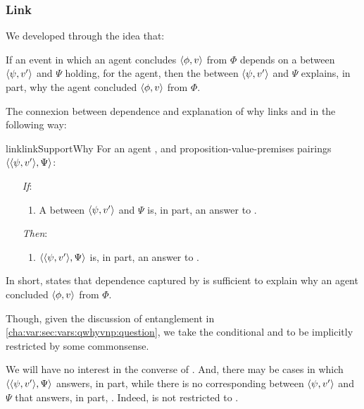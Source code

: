 \subsubsection{Link}
\label{cha:var:sec:vars:qwhyvnp:link}

\begin{note}
  We developed \qWhyV{} through the idea that:

  If an event in which an agent concludes \(\langle \phi, v \rangle\) from \(\Phi\) depends on a  between \(\langle \psi, v' \rangle\) and \(\Psi\) holding, for the agent, then the  between \(\langle \psi, v' \rangle\) and \(\Psi\) explains, in part, why the agent concluded \(\langle \phi, v \rangle\) from \(\Phi\).

  The connexion between dependence and explanation of why links \qWhyV{} and \qWhy{} in the following way:

  \begin{restatable}{link}{linkSupportWhy}
    \label{link:why:support:pvpp}
    For an agent \vAgent{}, and proposition-value-premises pairings \(\langle \langle \psi, v' \rangle, \Psi \rangle\):

    \begin{itemize}
    \item[\emph{If}:]
      \begin{enumerate}[label=\alph*., ref=(\alph*)]
      \item
        A  between \(\langle \psi, v' \rangle\) and \(\Psi\) is, in part, an answer to \qWhyV{}.
      \end{enumerate}
    \item[\emph{Then}:]
      \begin{enumerate}[label=\alph*., ref=(\alph*), resume]
      \item
        \(\langle \langle \psi, v' \rangle, \Psi \rangle\) is, in part, an answer to \qWhy{}.
      \end{enumerate}
    \end{itemize}
    \vspace{-\baselineskip}
  \end{restatable}

  In short, \linkW{} states that dependence captured by \qWhyV{} is sufficient to explain why an agent concluded \(\langle \phi, v \rangle\) from \(\Phi\).
\end{note}

\begin{note}
  Though, given the discussion of entanglement in \autoref{cha:var:sec:vars:qwhyvnp:question}, we take the conditional and to be implicitly restricted by some commonsense.

  We will have no interest in the converse of \linkW{}.
  And, there may be cases in which \(\langle \langle \psi, v' \rangle, \Psi \rangle\) answers, in part, \qWhy{} while there is no corresponding \ros{} between \(\langle \psi, v' \rangle\) and \(\Psi\) that answers, in part, \qWhyV{}.
  Indeed, \qWhy{} is not restricted to .
\end{note}

